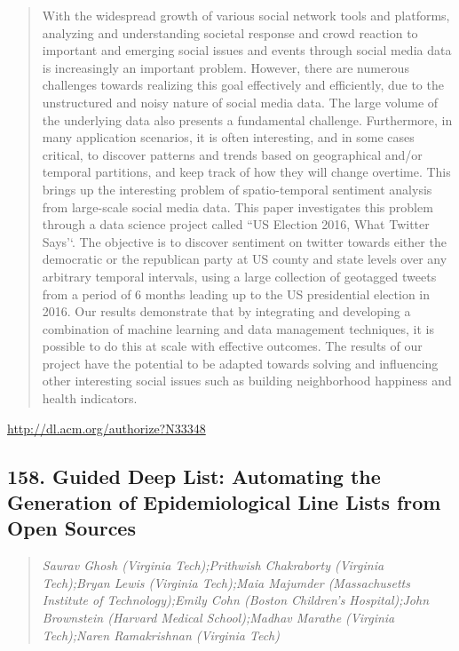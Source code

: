 \documentclass{article}
\begin{document}
\begin{quote}
With the widespread growth of various social network tools and platforms, analyzing and understanding societal response and crowd reaction to important and emerging social issues and events through social media data is increasingly an important problem. However, there are numerous challenges towards realizing this goal effectively and efficiently, due to the unstructured and noisy nature of social media data. The large volume of the underlying data also presents a fundamental challenge. Furthermore, in many application scenarios, it is often interesting, and in some cases critical, to discover patterns and trends based on geographical and/or temporal partitions, and keep track of how they will change overtime. This brings up the interesting problem of spatio-temporal sentiment analysis from large-scale social media data. This paper investigates this problem through a data science project called ``US Election 2016, What Twitter Says’‘. The objective is to discover sentiment on twitter towards either the democratic or the republican party at US county and state levels over any arbitrary temporal intervals, using a large collection of geotagged tweets from a period of 6 months leading up to the US presidential election in 2016. Our results demonstrate that by integrating and developing a combination of machine learning and data management techniques, it is possible to do this at scale with effective outcomes. The results of our project have the potential to be adapted towards solving and influencing other interesting social issues such as building neighborhood happiness and health indicators.
\end{quote}

\href{http://dl.acm.org/authorize?N33348}{http://dl.acm.org/authorize?N33348}

\subsection{158. Guided Deep List: Automating the Generation of Epidemiological Line Lists from Open Sources}

\begin{quote}
\footnotesize{\textit{Saurav Ghosh (Virginia Tech);Prithwish Chakraborty (Virginia Tech);Bryan Lewis (Virginia Tech);Maia Majumder (Massachusetts Institute of Technology);Emily Cohn (Boston Children's Hospital);John Brownstein (Harvard Medical School);Madhav Marathe (Virginia Tech);Naren Ramakrishnan (Virginia Tech)}}

\end{quote}
\end{document}
